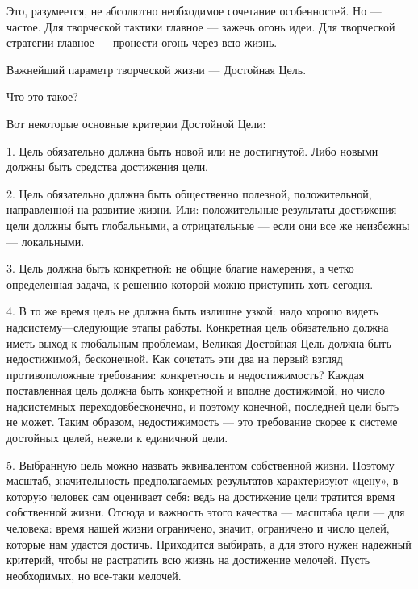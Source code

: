Это, разумеется, не абсолютно необходимое сочетание особенностей. Но —
частое.  Для  творческой тактики  главное  —  зажечь огонь  идеи.  Для
творческой стратегии главное — пронести огонь через всю жизнь.


Важнейший параметр творческой жизни — Достойная Цель.

Что это такое?

Вот некоторые основные критерии Достойной Цели:

1. Цель обязательно должна быть  новой или не достигнутой. Либо новыми
должны быть средства достижения цели.

2. Цель  обязательно должна быть общественно  полезной, положительной,
направленной   на  развитие   жизни.  Или:   положительные  результаты
достижения цели  должны быть глобальными,  а отрицательные —  если они
все же неизбежны — локальными.

3. Цель  должна быть  конкретной: не общие  благие намерения,  а четко
определенная задача, к решению которой можно приступить хоть сегодня.

4. В то же время цель не должна быть излишне узкой: надо хорошо видеть
надсистему—следующие этапы работы.  Конкретная цель обязательно должна
иметь выход к глобальным проблемам, Великая Достойная Цель должна быть
недостижимой,  бесконечной.  Как сочетать  эти  два  на первый  взгляд
противоположные  требования:  конкретность  и  недостижимость?  Каждая
поставленная цель должна быть конкретной и вполне достижимой, но число
надсистемных переходовбесконечно,  и поэтому конечной,  последней цели
быть не может. Таким образом, недостижимость — это требование скорее к
системе достойных целей, нежели к единичной цели.

5.   Выбранную    цель   можно   назвать    эквивалентом   собственной
жизни.  Поэтому  масштаб,  значительность  предполагаемых  результатов
характеризуют  «цену»,  в которую  человек  сам  оценивает себя:  ведь
на  достижение  цели  тратится   время  собственной  жизни.  Отсюда  и
важность этого  качества — масштаба  цели — для человека:  время нашей
жизни  ограничено,  значит,  ограничено  и число  целей,  которые  нам
удастся  достичь.  Приходится выбирать,  а  для  этого нужен  надежный
критерий, чтобы не  растратить всю жизнь на  достижение мелочей. Пусть
необходимых, но все-таки мелочей.

